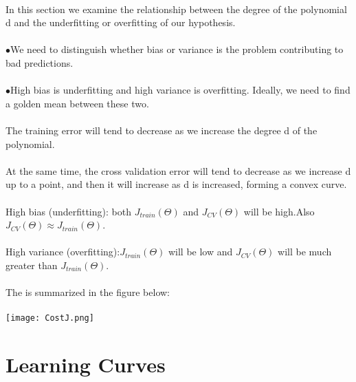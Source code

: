 \documentclass[UTF8]{ctexart}
\begin{document}
\paragraph{}
In this section we examine the relationship between the degree of the polynomial d and the underfitting or overfitting of our hypothesis.
\paragraph{}
$\bullet$We need to distinguish whether bias or variance is the problem contributing to bad predictions.
\paragraph{}
$\bullet$High bias is underfitting and high variance is overfitting. Ideally, we need to find a golden mean between these two.
\paragraph{}
The training error will tend to decrease as we increase the degree d of the polynomial.
\paragraph{}
At the same time, the cross validation error will tend to decrease as we increase d up to a point, and then it will increase as d is increased, forming a convex curve.
\paragraph{}
High bias (underfitting): both $J_{train}(\Theta)$ and $J_{CV}(\Theta)$ will be high.Also$J_{CV}(\Theta) \approx J_{train}(\Theta)$.
\paragraph{}
High variance (overfitting):$J_{train}(\Theta)$ will be low and $J_{CV}(\Theta)$ will be much greater than $J_{train}(\Theta)$.
\paragraph{}
The is summarized in the figure below:
\paragraph{}
\texttt{[image: CostJ.png]}
\section{Learning Curves}
\end{document}
